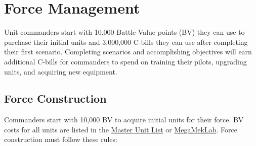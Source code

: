\documentclass{article}
\begin{document}
\newpage

\section{Force Management}

Unit commanders start with 10,000 Battle Value points (BV) they can use to purchase their initial units and 3,000,000 C-bills they can use after completing their first scenario.
Completing scenarios and accomplishing objectives will earn additional C-bills for commanders to spend on training their pilots, upgrading units, and acquiring new equipment.

\subsection{Force Construction}
\label{subsec:force_construction}

Commanders start with 10,000 BV to acquire initial units for their force.
BV costs for all units are listed in the \href{http://www.masterunitlist.info}{Master Unit List} or \href{https://megamek.org}{MegaMekLab}.
Force construction must follow these rules:
\end{document}
